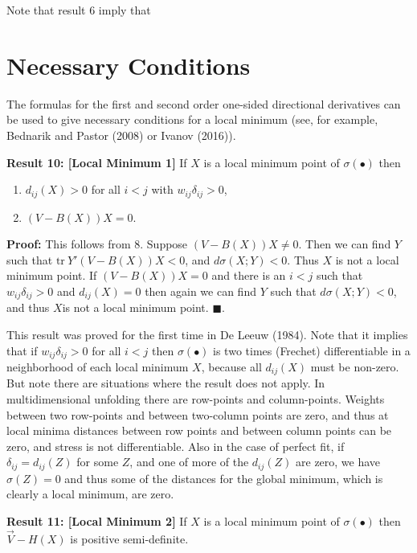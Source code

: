 \documentclass[12pt,]{article}
\providecommand{\tightlist}{%
  \setlength{\itemsep}{0pt}\setlength{\parskip}{0pt}}
\begin{document}
Note that result 6 imply that

\hypertarget{necessary-conditions}{%
\section{Necessary Conditions}\label{necessary-conditions}}

The formulas for the first and second order one-sided directional
derivatives can be used to give necessary conditions for a local minimum
(see, for example, Bednarik and Pastor (2008) or Ivanov (2016)).

\textbf{Result 10: {[}Local Minimum 1{]}} If \(X\) is a local minimum
point of \(\sigma(\bullet)\) then

\begin{enumerate}
\def\labelenumi{\arabic{enumi}.}
\tightlist
\item
  \(d_{ij}(X)>0\) for all \(i<j\) with \(w_{ij}\delta_{ij}>0\),
\item
  \((V-B(X))X = 0\).
\end{enumerate}

\textbf{Proof:} This follows from 8. Suppose \((V-B(X))X\not= 0\). Then
we can find \(Y\) such that \(\text{tr}\ Y'(V-B(X))X<0\), and
\(d\sigma(X;Y)<0\). Thus \(X\) is not a local minimum point. If
\((V-B(X))X=0\) and there is an \(i<j\) such that
\(w_{ij}\delta_{ij}>0\) and \(d_{ij}(X)=0\) then again we can find \(Y\)
such that \(d\sigma(X;Y)<0\), and thus \(X\)is not a local minimum
point. \(\blacksquare\).

This result was proved for the first time in De Leeuw (1984). Note that
it implies that if \(w_{ij}\delta_{ij}>0\) for all \(i<j\) then
\(\sigma(\bullet)\) is two times (Frechet) differentiable in a
neighborhood of each local minimum \(X\), because all \(d_{ij}(X)\) must
be non-zero. But note there are situations where the result does not
apply. In multidimensional unfolding there are row-points and
column-points. Weights between two row-points and between two-column
points are zero, and thus at local minima distances between row points
and between column points can be zero, and stress is not differentiable.
Also in the case of perfect fit, if \(\delta_{ij}=d_{ij}(Z)\) for some
\(Z\), and one of more of the \(d_{ij}(Z)\) are zero, we have
\(\sigma(Z)=0\) and thus some of the distances for the global minimum,
which is clearly a local minimum, are zero.

\textbf{Result 11: {[}Local Minimum 2{]}} If \(X\) is a local minimum
point of \(\sigma(\bullet)\) then \(\overrightarrow{V}-H(X)\) is
positive semi-definite.
\end{document}
